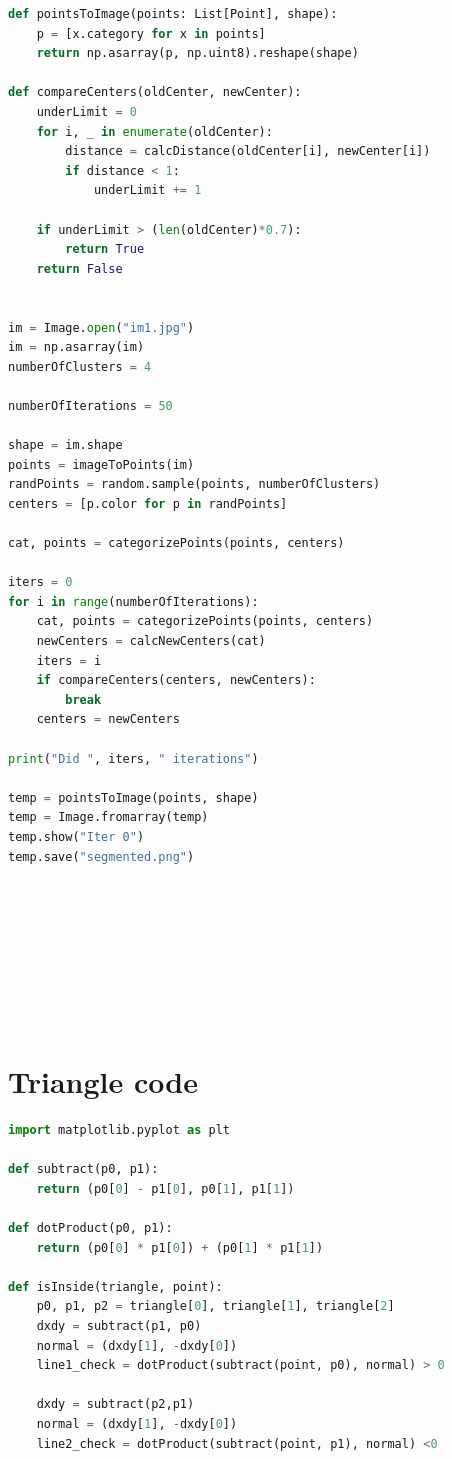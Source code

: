 \documentclass{article}
\begin{document}
\begin{appendices}
\begin{lstlisting}[language=python]
def pointsToImage(points: List[Point], shape):
    p = [x.category for x in points]
    return np.asarray(p, np.uint8).reshape(shape)

def compareCenters(oldCenter, newCenter):
    underLimit = 0
    for i, _ in enumerate(oldCenter):
        distance = calcDistance(oldCenter[i], newCenter[i])
        if distance < 1:
            underLimit += 1
    
    if underLimit > (len(oldCenter)*0.7):
        return True
    return False


im = Image.open("im1.jpg")
im = np.asarray(im)
numberOfClusters = 4

numberOfIterations = 50

shape = im.shape
points = imageToPoints(im)
randPoints = random.sample(points, numberOfClusters)
centers = [p.color for p in randPoints]

cat, points = categorizePoints(points, centers)

iters = 0
for i in range(numberOfIterations):
    cat, points = categorizePoints(points, centers)
    newCenters = calcNewCenters(cat)
    iters = i
    if compareCenters(centers, newCenters):
        break
    centers = newCenters

print("Did ", iters, " iterations")

temp = pointsToImage(points, shape)
temp = Image.fromarray(temp)
temp.show("Iter 0")
temp.save("segmented.png")







            
        \end{lstlisting}


        \section{Triangle code}
        \label{appendix:tri}
        \begin{lstlisting}[language=python]
import matplotlib.pyplot as plt

def subtract(p0, p1):
    return (p0[0] - p1[0], p0[1], p1[1])

def dotProduct(p0, p1):
    return (p0[0] * p1[0]) + (p0[1] * p1[1])

def isInside(triangle, point):
    p0, p1, p2 = triangle[0], triangle[1], triangle[2]
    dxdy = subtract(p1, p0)
    normal = (dxdy[1], -dxdy[0])
    line1_check = dotProduct(subtract(point, p0), normal) > 0

    dxdy = subtract(p2,p1)
    normal = (dxdy[1], -dxdy[0])
    line2_check = dotProduct(subtract(point, p1), normal) <0


\end{lstlisting}
\end{appendices}
\end{document}
